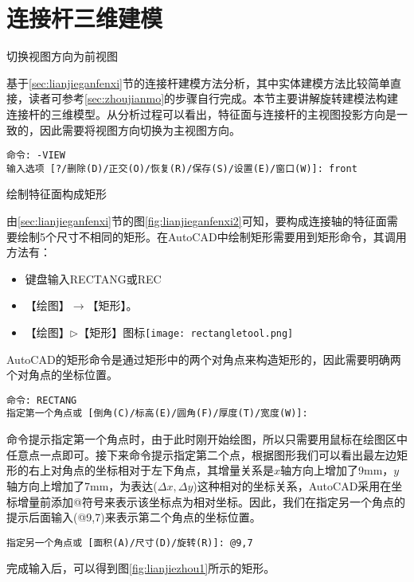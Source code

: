 \section{连接杆三维建模}
\begin{procedure}
\item 切换视图方向为前视图

基于\ref{sec:lianjieganfenxi}节的连接杆建模方法分析，其中实体建模方法比较简单直接，读者可参考\ref{sec:zhoujianmo}的步骤自行完成。本节主要讲解旋转建模法构建连接杆的三维模型。从分析过程可以看出，特征面与连接杆的主视图投影方向是一致的，因此需要将视图方向切换为主视图方向。
\begin{lstlisting}
命令: -VIEW
输入选项 [?/删除(D)/正交(O)/恢复(R)/保存(S)/设置(E)/窗口(W)]: front 
\end{lstlisting}

\item 绘制特征面构成矩形

由\ref{sec:lianjieganfenxi}节的图\ref{fig:lianjieganfenxi2}可知，要构成连接轴的特征面需要绘制5个尺寸不相同的矩形。在AutoCAD中绘制矩形需要用到矩形命令，其调用方法有：
\begin{itemize}
\item 键盘输入RECTANG或REC
\item 【绘图】$\rightarrow$【矩形】。
\item 【绘图】$\triangleright$【矩形】图标\texttt{[image: rectangletool.png]}
\end{itemize}

AutoCAD的矩形命令是通过矩形中的两个对角点来构造矩形的，因此需要明确两个对角点的坐标位置。
\begin{lstlisting}
命令: RECTANG
指定第一个角点或 [倒角(C)/标高(E)/圆角(F)/厚度(T)/宽度(W)]:
\end{lstlisting}

命令提示指定第一个角点时，由于此时刚开始绘图，所以只需要用鼠标在绘图区中任意点一点即可。接下来命令提示指定第二个点，根据图形我们可以看出最左边矩形的右上对角点的坐标相对于左下角点，其增量关系是$x$轴方向上增加了9mm，$y$轴方向上增加了7mm，为表达($\Delta x,\Delta y$)这种相对的坐标关系，AutoCAD采用在坐标增量前添加@符号来表示该坐标点为相对坐标。因此，我们在指定另一个角点的提示后面输入(@9,7)来表示第二个角点的坐标位置。
\begin{lstlisting}
指定另一个角点或 [面积(A)/尺寸(D)/旋转(R)]: @9,7
\end{lstlisting}

完成输入后，可以得到图\ref{fig:lianjiezhou1}所示的矩形。


\end{procedure}
